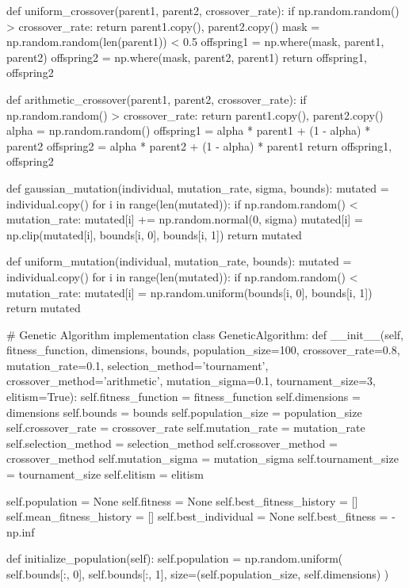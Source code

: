 \documentclass[a4paper, 11pt]{article}
\begin{document}
\begin{pycode}
def uniform_crossover(parent1, parent2, crossover_rate):
    if np.random.random() > crossover_rate:
        return parent1.copy(), parent2.copy()
    mask = np.random.random(len(parent1)) < 0.5
    offspring1 = np.where(mask, parent1, parent2)
    offspring2 = np.where(mask, parent2, parent1)
    return offspring1, offspring2

def arithmetic_crossover(parent1, parent2, crossover_rate):
    if np.random.random() > crossover_rate:
        return parent1.copy(), parent2.copy()
    alpha = np.random.random()
    offspring1 = alpha * parent1 + (1 - alpha) * parent2
    offspring2 = alpha * parent2 + (1 - alpha) * parent1
    return offspring1, offspring2

def gaussian_mutation(individual, mutation_rate, sigma, bounds):
    mutated = individual.copy()
    for i in range(len(mutated)):
        if np.random.random() < mutation_rate:
            mutated[i] += np.random.normal(0, sigma)
            mutated[i] = np.clip(mutated[i], bounds[i, 0], bounds[i, 1])
    return mutated

def uniform_mutation(individual, mutation_rate, bounds):
    mutated = individual.copy()
    for i in range(len(mutated)):
        if np.random.random() < mutation_rate:
            mutated[i] = np.random.uniform(bounds[i, 0], bounds[i, 1])
    return mutated

# Genetic Algorithm implementation
class GeneticAlgorithm:
    def __init__(self, fitness_function, dimensions, bounds,
                 population_size=100, crossover_rate=0.8, mutation_rate=0.1,
                 selection_method='tournament', crossover_method='arithmetic',
                 mutation_sigma=0.1, tournament_size=3, elitism=True):
        self.fitness_function = fitness_function
        self.dimensions = dimensions
        self.bounds = bounds
        self.population_size = population_size
        self.crossover_rate = crossover_rate
        self.mutation_rate = mutation_rate
        self.selection_method = selection_method
        self.crossover_method = crossover_method
        self.mutation_sigma = mutation_sigma
        self.tournament_size = tournament_size
        self.elitism = elitism

        self.population = None
        self.fitness = None
        self.best_fitness_history = []
        self.mean_fitness_history = []
        self.best_individual = None
        self.best_fitness = -np.inf

    def initialize_population(self):
        self.population = np.random.uniform(
            self.bounds[:, 0], self.bounds[:, 1],
            size=(self.population_size, self.dimensions)
        )


\end{pycode}
\end{document}
